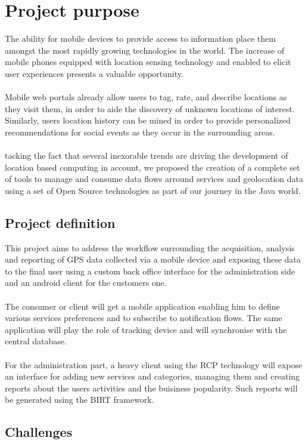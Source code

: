
\section{Project purpose}
The ability for mobile devices to provide access to information place them
amongst the most rapidly growing technologies in the world. The increase of
mobile phones equipped with location sensing technology and enabled to elicit
user experiences presents a valuable opportunity.
\\
\\
Mobile web portals already allow users to tag, rate, and describe locations as
they visit them, in order to aide the discovery of unknown locations of interest.
Similarly, users location history can be mined in order to provide personalized
recommendations for social events as they occur in the surrounding areas.
\\
\\
tacking the fact that several inexorable trends are driving the development of
location based computing in account, we proposed the creation of a complete set
of tools to manage and consume data flows arround services and geolocation data
using a set of Open Source technologies as part of our journey in the Java world.

\subsection{Project definition}
This project aims to address the workflow surrounding the acquisition, analysis
and reporting of GPS data collected via a mobile device and exposing these data
to the final user using a custom back office interface for the administration
side and an android client for the customers one.
\\
\\
The consumer or client will get a mobile application enabling him to define
various services preferences and to subscribe to notification flows. The same
application will play the role of tracking device and will synchronise with the
central database.
\\
\\
For the administration part, a heavy client using the RCP technology will expose
an interface for adding new services and categories, managing them and creating
reports about the users activities and the buisiness popularity. Such reports
will be generated using the BIRT framework.

\subsection{Challenges}
